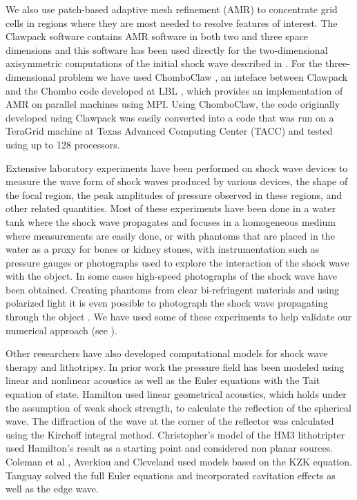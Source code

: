 We also use patch-based adaptive mesh refinement (AMR) to concentrate
grid cells in regions where they are most needed to resolve features
of interest.  The Clawpack software contains AMR software in both
two and three space dimensions and this software has been used
directly for the two-dimensional axisymmetric computations of the
initial shock wave described in .  For the three-dimensional
problem we have used ChomboClaw \cite{??}, an inteface between
Clawpack and the Chombo code developed at LBL \cite{chomboclaw}, which
provides an implementation of AMR on parallel machines using MPI.
Using ChomboClaw, the code originally developed using Clawpack was
easily converted into a code that was run on a TeraGrid machine at
Texas Advanced Computing Center (TACC) and tested using up to 128 processors.


Extensive laboratory experiments have been performed on
shock wave devices to measure the wave form of shock waves produced by
various devices, the shape of the focal region, the peak amplitudes of
pressure observed in these regions, and other related quantities.  Most of
these experiments have been done in a water tank where the shock wave
propagates and focuses in a homogeneous medium where measurements are easily
done, or with phantoms that are placed in the water as a proxy for bones or
kidney stones, with instrumentation such as pressure gauges or photographs
used to explore the interaction of the shock wave with the object.  In some
cases high-speed photographs of the shock wave have been obtained.
Creating phantoms from clear bi-refringent materials and using polarized
light it is even possible to photograph the shock wave propagating through
the object \cite{??}.  We have used some of these experiments to help
validate our numerical approach (see ).

Other researchers have also developed computational models for 
shock wave therapy and lithotripsy.
In prior work the pressure field has been modeled using linear and
nonlinear acoustics as well as the Euler equations with the Tait
equation of state.  Hamilton \cite{hamilton} used linear geometrical
acoustics, which holds under the assumption of weak shock strength,
to calculate the reflection of the spherical wave.  The diffraction
of the wave at the corner of the reflector was calculated using the
Kirchoff integral method.  Christopher's \cite{christopher_hm3}
model of the HM3 lithotripter used Hamilton's result as a starting
point and considered non planar sources.  Coleman et al \cite{coleman},
Averkiou and Cleveland \cite{cleveland_averkiou} used models based
on the KZK equation.  Tanguay \cite{tanguay} solved the full Euler
equations and incorporated cavitation effects as well as the edge
wave.

